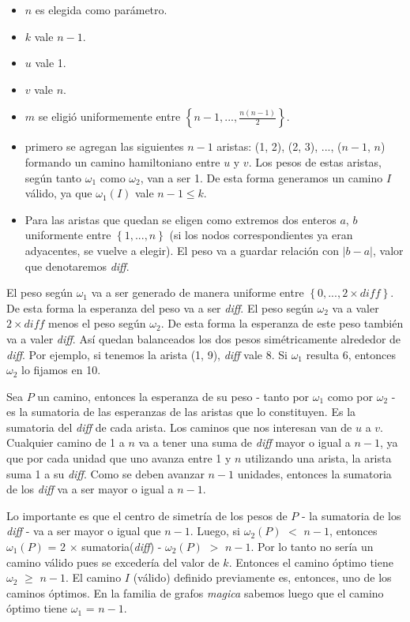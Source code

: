 \begin{itemize}
    \begin{itemize}
        \item $n$ es elegida como parámetro.
        \item $k$ vale $n-1$.
        \item $u$ vale 1.
        \item $v$ vale $n$.
        \item $m$ se eligió uniformemente entre $\left\{{n-1, ..., \frac{n(n-1)}{2}}\right\}$.
        \item primero se agregan las siguientes $n-1$ aristas: (1, 2), (2, 3), ..., ($n-1$, $n$) formando un camino hamiltoniano entre $u$ y $v$. Los pesos de estas aristas, según tanto $\omega_1$ como $\omega_2$, van a ser 1. De esta forma generamos un camino $I$ válido, ya que $\omega_1(I)$ vale $n-1 \leq k$.
        \item Para las aristas que quedan se eligen como extremos dos enteros $a$, $b$ uniformente entre $\left\{{1, ..., n}\right\}$ (si los nodos correspondientes ya eran adyacentes, se vuelve a elegir). El peso va a guardar relación con $|b-a|$, valor que denotaremos \textit{diff}.
    \end{itemize}
\end{itemize}

El peso según $\omega_1$ va a ser generado de manera uniforme entre $\left\{{0, ..., 2 \times diff}\right\}$. De esta forma la esperanza del peso va a ser \textit{diff}. El peso según $\omega_2$ va a valer $2 \times diff$ menos el peso según $\omega_2$. De esta forma la esperanza de este peso también va a valer \textit{diff}. Así quedan balanceados los dos pesos simétricamente alrededor de \textit{diff}. Por ejemplo, si tenemos la arista (1, 9), \textit{diff} vale 8. Si $\omega_1$ resulta 6, entonces $\omega_2$ lo fijamos en 10.

Sea $P$ un camino, entonces la esperanza de su peso - tanto por $\omega_1$ como por $\omega_2$ - es la sumatoria de las esperanzas de las aristas que lo constituyen. Es la sumatoria del \textit{diff} de cada arista. Los caminos que nos interesan van de $u$ a $v$. Cualquier camino de 1 a $n$  va a tener una suma de \textit{diff} mayor o igual a $n-1$, ya que por cada unidad que uno avanza entre 1 y $n$ utilizando una arista, la arista suma 1 a su \textit{diff}. Como se deben avanzar $n-1$ unidades, entonces la sumatoria de los \textit{diff} va a ser mayor o igual a $n-1$.

Lo importante es que el centro de simetría de los pesos de $P$ - la sumatoria de los \textit{diff} - va a ser mayor o igual que $n-1$. Luego, si $\omega_2(P)$ $<$ $n-1$, entonces $\omega_1(P)$ = 2 $\times$ sumatoria(\textit{diff}) - $\omega_2(P)$ $>$ $n-1$. Por lo tanto no sería un camino válido pues se excedería del valor de $k$. Entonces el camino óptimo tiene $\omega_2$ $\geq$ $n-1$. El camino $I$ (válido) definido previamente es, entonces, uno de los caminos óptimos. En la familia de grafos \textit{magica} sabemos luego que el camino óptimo tiene $\omega_1$ = $n-1$.

